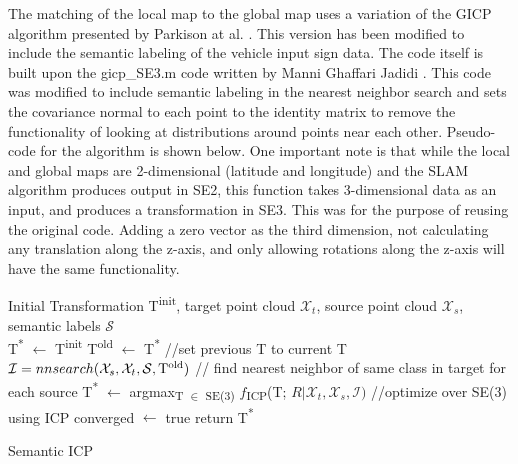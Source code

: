 \documentclass[letterpaper, 10 pt, conference]{ieeeconf}  %
\begin{document}
The matching of the local map to the global map uses a variation of the GICP algorithm presented by Parkison at al. \cite{cGICP}. This version has been modified to include the semantic labeling of the vehicle input sign data. The code itself is built upon the gicp\_SE3.m code written by Manni Ghaffari Jadidi \cite{cgicpse3}. This code was modified to include semantic labeling in the nearest neighbor search and sets the covariance normal to each point to the identity matrix to remove the functionality of looking at distributions around points near each other. Pseudo-code for the algorithm is shown below. One important note is that while the local and global maps are 2-dimensional (latitude and longitude) and the SLAM algorithm produces output in SE2, this function takes 3-dimensional data as an input, and produces a transformation in SE3. This was for the purpose of reusing the original code. Adding a zero vector as the third dimension, not calculating any translation along the z-axis, and only allowing rotations along the z-axis will have the same functionality.

\begin{algorithm}[ht]
\label{alg:sicpse3}
\begin{algorithmic}[1]
\Require  Initial Transformation T\textsuperscript{init}, target point cloud $\mathcal{X}_t$, source point cloud $\mathcal{X}_s$, semantic labels $\mathcal{S}$\\
T\textsuperscript{*} $\leftarrow$ T\textsuperscript{init}
		\State T\textsuperscript{old} $\leftarrow$ T\textsuperscript{*} //set previous T to current T
		\State $\mathcal{I} = nnsearch{(\mathcal{X}_s, \mathcal{X}_t, \mathcal{S},  \mathrm{T\textsuperscript{old})}}$ // find nearest neighbor of same class in target for each source
		\State T\textsuperscript{*} $\leftarrow$ argmax\textsubscript{T $\in$ SE(3)} $f$\textsubscript{ICP}(T; $R|\mathcal{X}_t, \mathcal{X}_s, \mathcal{I})$ //optimize over SE(3) using ICP
			\State converged $\leftarrow$ true	
		\EndIf
	\EndWhile
	\State return T\textsuperscript{*}
\caption{Semantic ICP}
\end{algorithmic}
\end{algorithm}
\end{document}
